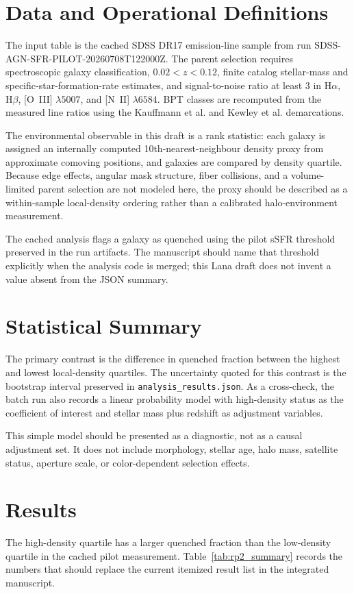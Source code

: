 \documentclass[twocolumn]{aastex631}
\begin{document}
\section{Data and Operational Definitions}\label{sec:data}
The input table is the cached SDSS DR17 emission-line sample from run SDSS-AGN-SFR-PILOT-20260708T122000Z.  The parent selection requires spectroscopic galaxy classification, $0.02<z<0.12$, finite catalog stellar-mass and specific-star-formation-rate estimates, and signal-to-noise ratio at least 3 in H$\alpha$, H$\beta$, [O~III] $\lambda5007$, and [N~II] $\lambda6584$.  BPT classes are recomputed from the measured line ratios using the Kauffmann et al. and Kewley et al. demarcations.

The environmental observable in this draft is a rank statistic: each galaxy is assigned an internally computed 10th-nearest-neighbour density proxy from approximate comoving positions, and galaxies are compared by density quartile.  Because edge effects, angular mask structure, fiber collisions, and a volume-limited parent selection are not modeled here, the proxy should be described as a within-sample local-density ordering rather than a calibrated halo-environment measurement.

The cached analysis flags a galaxy as quenched using the pilot sSFR threshold preserved in the run artifacts.  The manuscript should name that threshold explicitly when the analysis code is merged; this Lana draft does not invent a value absent from the JSON summary.

\section{Statistical Summary}\label{sec:methods}
The primary contrast is the difference in quenched fraction between the highest and lowest local-density quartiles.  The uncertainty quoted for this contrast is the bootstrap interval preserved in \texttt{analysis\_results.json}.  As a cross-check, the batch run also records a linear probability model with high-density status as the coefficient of interest and stellar mass plus redshift as adjustment variables.

This simple model should be presented as a diagnostic, not as a causal adjustment set.  It does not include morphology, stellar age, halo mass, satellite status, aperture scale, or color-dependent selection effects.

\section{Results}\label{sec:results}
The high-density quartile has a larger quenched fraction than the low-density quartile in the cached pilot measurement.  Table~\ref{tab:rp2_summary} records the numbers that should replace the current itemized result list in the integrated manuscript.
\end{document}
